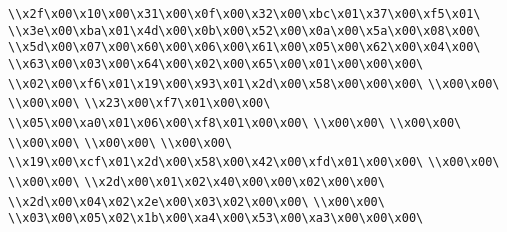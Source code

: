 \verb|\\x2f\x00\x10\x00\x31\x00\x0f\x00\x32\x00\xbc\x01\x37\x00\xf5\x01\|\newline
\verb|\\x3e\x00\xba\x01\x4d\x00\x0b\x00\x52\x00\x0a\x00\x5a\x00\x08\x00\|\newline
\verb|\\x5d\x00\x07\x00\x60\x00\x06\x00\x61\x00\x05\x00\x62\x00\x04\x00\|\newline
\verb|\\x63\x00\x03\x00\x64\x00\x02\x00\x65\x00\x01\x00\x00\x00\|\newline
\verb|\\x02\x00\xf6\x01\x19\x00\x93\x01\x2d\x00\x58\x00\x00\x00\|\newline
\verb|\\x00\x00\|\newline
\verb|\\x00\x00\|\newline
\verb|\\x23\x00\xf7\x01\x00\x00\|\newline
\verb|\\x05\x00\xa0\x01\x06\x00\xf8\x01\x00\x00\|\newline
\verb|\\x00\x00\|\newline
\verb|\\x00\x00\|\newline
\verb|\\x00\x00\|\newline
\verb|\\x00\x00\|\newline
\verb|\\x00\x00\|\newline
\verb|\\x19\x00\xcf\x01\x2d\x00\x58\x00\x42\x00\xfd\x01\x00\x00\|\newline
\verb|\\x00\x00\|\newline
\verb|\\x00\x00\|\newline
\verb|\\x2d\x00\x01\x02\x40\x00\x00\x02\x00\x00\|\newline
\verb|\\x2d\x00\x04\x02\x2e\x00\x03\x02\x00\x00\|\newline
\verb|\\x00\x00\|\newline
\verb|\\x03\x00\x05\x02\x1b\x00\xa4\x00\x53\x00\xa3\x00\x00\x00\|\newline
